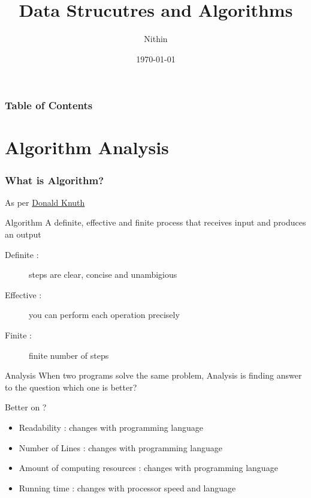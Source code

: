 \documentclass{beamer}
\title{Data Strucutres and Algorithms}
\author{Nithin}
\institute{}
\date{\today}
\begin{document}
\frame{\titlepage}

\begin{frame}
    \frametitle{Table of Contents}
    \tableofcontents
\end{frame}
\section{Algorithm Analysis}
\begin{frame}
\frametitle{What is Algorithm?}
As per \href{https://en.wikipedia.org/wiki/Donald_Knuth}{Donald Knuth}
\begin{alertblock}{Algorithm}
     A definite, effective and finite process that receives input and produces an output
\end{alertblock}
\begin{description}
    \item [Definite :] steps are clear, concise and unambigious
    \item [Effective :] you can perform each operation precisely 
    \item [Finite :] finite number of steps
\end{description}
\begin{alertblock}{Analysis}
    When two programs solve the same problem, Analysis is finding answer to the question which one is \alert{better}?
\end{alertblock}

\end{frame}


\begin{frame}{Better on ?}
    \begin{itemize}
        \item <1-> Readability : \pause changes with programming language \pause
        \item <2-> Number of Lines : \pause changes with programming language \pause
        \item <3-> Amount of computing resources : \pause changes with programming language\pause
        \item <4-> Running time : \pause changes with processor speed and language \pause
    \end{itemize}
\end{frame}
\end{document}
